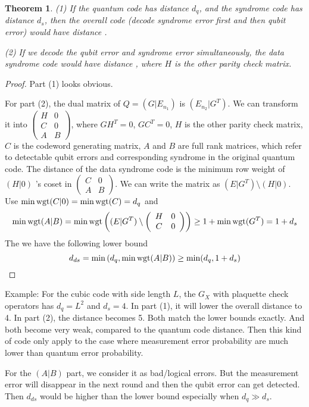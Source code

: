 \documentclass[aps,prb,12pt,tightenlines,%
notitlepage,longbibliography]{revtex4-1}
\newtheorem{theorem}{Theorem}
\begin{document}
\begin{theorem}
 (1) If the quantum code has distance $d_q$, and the syndrome code has distance $d_s$, then the overall code (decode syndrome error first and then qubit error) would have distance .

(2) If we decode the qubit error and syndrome error simultaneously, the data syndrome code would have distance 
, where $H$ is the other parity check matrix.
\end{theorem}
\begin{proof}
 Part (1) looks obvious. 

For part (2), the dual matrix of $Q=( G|E_{n_1} )$ is $(E_{n_2}|G^T)$. We can transform it into $ \left( \begin{array}{cc} H & 0 \\ C & 0\\ A &B \end{array} \right)$, where $GH^T=0$, $GC^T =0$, $H$ is the other parity check matrix, $C$ is the codeword generating matrix, $A$ and $B$ are full rank matrices, which refer to detectable qubit errors and corresponding syndrome in the original quantum code. The distance of the data syndrome code is the minimum row weight of $(H|0)$ 's coset in $ \left( \begin{array}{cc}  C & 0\\ A &B \end{array} \right)$. We can write the matrix as $ (E|G^T) \setminus (H|0)   $. 
Use $\min \mathop{\rm wgt} (C|0)=\min \mathop{\rm wgt} (C)=d_q$ and
$$\min \mathop{\rm wgt} (A|B) = \min \mathop{\rm wgt} \left( (E|G^T) 
\setminus \left( \begin{array}{cc} H & 0 \\ C & 0 \end{array} \right) \right)
\ge 1+ \min \mathop{\rm wgt} (G^T) =1+d_s$$
The we have the following lower bound
$$d_{ds} =\min \left(   d_q, \min \mathop{\rm wgt} (A|B)  \right)
\ge \min(d_q,1+d_s)$$
\end{proof}
Example: For the cubic code with side length $L$, the $G_X$ with plaquette check operators has $d_q=L^2$ and $d_s=4$. In part (1), it will lower the overall distance to 4. In part (2), the distance becomes 5. Both match the lower bounds exactly. And both become very weak, compared to the quantum code distance.
Then this kind of code only apply to the case where measurement error probability are much lower than quantum error probability.

For the $(A|B)$ part, we consider it as bad/logical errors. But the measurement error will disappear in the next round and then the qubit error can get detected. Then $d_{ds}$ would be higher than the lower bound especially when $d_q \gg d_s$.
\end{document}
